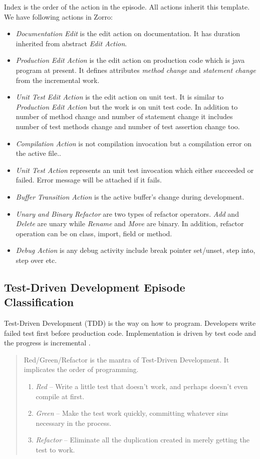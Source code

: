 \documentclass[11pt,twocolumn]{article}
\begin{document}
Index is the order of the action in the episode. All actions inherit this
template. We have following actions in Zorro:
\begin{itemize}
\item \textit{Documentation Edit} is the edit action on documentation. It
  has duration inherited from abstract \textit{Edit Action}.
\item \textit{Production Edit Action} is the edit action on production
  code which is java program at present. It defines attributes
  \textit{method change} and \textit{statement change} from the
  incremental work.
\item \textit{Unit Test Edit Action} is the edit action on unit test. It is
  similar to \textit{Production Edit Action} but the work is on unit test
  code. In addition to number of method change and number of statement
  change it includes number of test methods change and number of test
  assertion change too.
\item \textit{Compilation Action} is not compilation invocation but a
  compilation error on the active file..
\item \textit{Unit Test Action} represents an unit test invocation which
  either succeeded or failed. Error message will be attached if it fails.
\item \textit{Buffer Transition Action} is the active buffer's change
  during development.
\item \textit{Unary and Binary Refactor} are two types of refactor
  operators. \textit{Add} and \textit{Delete} are unary while
  \textit{Rename} and \textit{Move} are binary. In addition, refactor
  operation can be on class, import, field or method.
\item \textit{Debug Action} is any debug activity include break pointer
  set/unset, step into, step over etc.
\end{itemize}

\subsection{Test-Driven Development Episode Classification}
Test-Driven Development (TDD) is the way on how to program. Developers
write failed test first before production code. Implementation is driven by
test code and the progress is incremental \cite{Beck:03}.
\begin{quote}
  Red/Green/Refactor is the mantra of Test-Driven Development. It
  implicates the order of programming. 
  \begin{enumerate}
    \item \textit{Red} -- Write a little test that doesn't work, and perhaps
      doesn't even compile at first.
    \item \textit{Green} -- Make the test work quickly, committing whatever
       sins necessary in the process.
    \item \textit{Refactor} -- Eliminate all the duplication created in merely
       getting the test to work.
\end{enumerate}
\end{quote}
\end{document}
